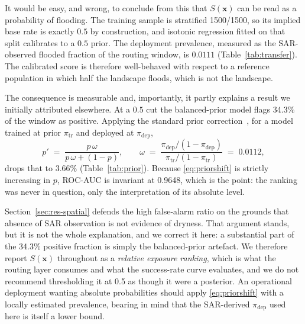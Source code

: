 \documentclass[journal]{IEEEtran}
\newcommand{\Sx}{S(\mathbf{x})}
\begin{document}
It would be easy, and wrong, to conclude from this that $\Sx$ can be read as a
probability of flooding. The training sample is stratified \num{1500}/\num{1500},
so its implied base rate is exactly $0.5$ by construction, and isotonic
regression fitted on that split calibrates to a $0.5$ prior. The deployment
prevalence, measured as the SAR-observed flooded fraction of the routing window,
is $0.0111$ (Table~\ref{tab:transfer}). The calibrated score is therefore
well-behaved with respect to a reference population in which half the landscape
floods, which is not the landscape.

The consequence is measurable and, importantly, it partly explains a result we
initially attributed elsewhere. At a $0.5$ cut the balanced-prior model flags
34.3\% of the window as positive. Applying the standard prior
correction~\citep{elkan2001,saerens2002}, for a model trained at prior
$\pi_{\mathrm{tr}}$ and deployed at $\pi_{\mathrm{dep}}$,
\begin{equation}
p' \;=\; \frac{p\,\omega}{p\,\omega + (1-p)},
\qquad
\omega \;=\; \frac{\pi_{\mathrm{dep}}/(1-\pi_{\mathrm{dep}})}
                  {\pi_{\mathrm{tr}}/(1-\pi_{\mathrm{tr}})} \;=\; 0.0112,
\label{eq:priorshift}
\end{equation}
drops that to 3.66\% (Table~\ref{tab:prior}). Because \eqref{eq:priorshift} is
strictly increasing in $p$, ROC-AUC is invariant at 0.9648, which is the point:
the ranking was never in question, only the interpretation of its absolute level.

Section~\ref{sec:res-spatial} defends the high false-alarm ratio on the grounds
that absence of SAR observation is not evidence of dryness. That argument stands,
but it is not the whole explanation, and we correct it here: a substantial part
of the 34.3\% positive fraction is simply the balanced-prior artefact. We
therefore report $\Sx$ throughout as a \emph{relative exposure ranking}, which is
what the routing layer consumes and what the success-rate curve evaluates, and we
do not recommend thresholding it at 0.5 as though it were a posterior. An
operational deployment wanting absolute probabilities should apply
\eqref{eq:priorshift} with a locally estimated prevalence, bearing in mind that
the SAR-derived $\pi_{\mathrm{dep}}$ used here is itself a lower bound.
\end{document}
